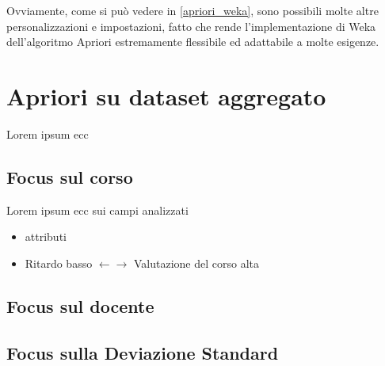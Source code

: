         Ovviamente, come si può vedere in \ref{apriori_weka}, sono possibili molte altre personalizzazioni e impostazioni, fatto che rende l'implementazione di Weka dell'algoritmo Apriori estremamente flessibile ed adattabile a molte esigenze.
 
\section{Apriori su dataset aggregato}

    Lorem ipsum ecc

        \subsection{Focus sul corso}

            Lorem ipsum ecc sui campi analizzati

            \begin{itemize}
                \item attributi
            \end{itemize}

            

            \begin{itemize}
                \item Ritardo basso $\leftarrow \rightarrow$ Valutazione del corso alta
            \end{itemize}

        \subsection{Focus sul docente}

            

        \subsection{Focus sulla Deviazione Standard}

            
